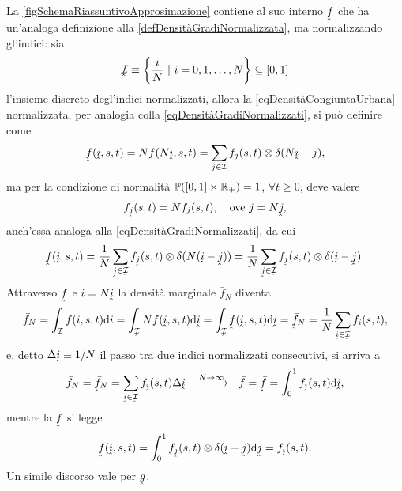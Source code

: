       \begin{oss}
        La \cref{figSchemaRiassuntivoApprosimazione} contiene al suo interno \(\underhat f\) che ha un'analoga definizione alla \cref{defDensitàGradiNormalizzata}, ma normalizzando gl'indici: sia%
        \[
          \underhat{\mathcal I}\equiv\left\{\frac iN\ |\ i=0,1,\ldots,N\right\}\subseteq[0,1]
        \]
        l'insieme discreto degl'indici normalizzati, allora la \cref{eqDensitàCongiuntaUrbana} normalizzata, per analogia colla \cref{eqDensitàGradiNormalizzati}, si può definire come
        \[
          \underhat f(\underhat i,s,t)=Nf(N\underhat i,s,t)=\sum_{j\in\mathcal I}f_j(s,t)\otimes\delta(N\underhat i-j),
        \]
        ma per la condizione di normalità \(\mathbb P([0,1]\times\mathbb R_+)=1\), \(\forall t\geq0\), deve valere\footnotemark{}%
        \[
          f_{\underhat j}(s,t)=Nf_j(s,t),\quad\text{ove }j=N\underhat j,
        \]
        anch'essa analoga alla \cref{eqDensitàGradiNormalizzati}, da cui
        \[
          \underhat f(\underhat i,s,t)
          =\frac1N\sum_{\underhat j\in\underhat{\mathcal I}}f_{\underhat j}(s,t)\otimes\delta(N(\underhat i-\underhat j))
          =\frac1N\sum_{\underhat j\in\underhat{\mathcal I}}f_{\underhat j}(s,t)\otimes\delta(\underhat i-\underhat j).
        \]
        Attraverso \(\underhat f\) e \(i=N\underhat i\) la densità marginale \(\bar f_N\) diventa
        \[
          \bar f_N
          =\int_{\mathcal I}f(i,s,t)\de i
          =\int_{\underhat{\mathcal I}}Nf(\underhat i,s,t)\de\underhat i
          =\int_{\underhat{\mathcal I}}\underhat f(\underhat i,s,t)\de\underhat i
          =\underhat{\bar f}_N
          =\frac1N\sum_{\underhat i\in\underhat{\mathcal I}}f_{\underhat i}(s,t),
        \]
        e, detto \(\Delta\underhat i\equiv1/N\) il passo tra due indici normalizzati consecutivi, si arriva a
        \[
          \bar f_N=\underhat{\bar f}_N
          =\sum_{\underhat i\in\underhat{\mathcal I}}f_{\underhat i}(s,t)\Delta\underhat i
          \ \ \xrightarrow{N\to\infty}\ \ 
          \bar f=\underhat{\bar f}
          =\int_0^1f_{\underhat i}(s,t)\de\underhat i,
        \]
        mentre la \(\underhat f\) si legge
        \[
          \underhat f(\underhat i,s,t)
          =\int_0^1f_{\underhat j}(s,t)\otimes\delta(\underhat i-\underhat j)\de\underhat j
          =f_{\underhat i}(s,t).
        \]
        Un simile discorso vale per \(\underhat g\).
      \end{oss}

